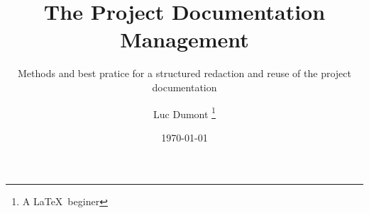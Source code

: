 \documentclass[
	fontsize=10pt, %
	twoside=false, %
	numbers=noenddot, %
]{kaobook}
\begin{document}
\title[The Project Documentation Management]{The Project Documentation Management}
\subtitle{Methods and best pratice for a structured redaction and reuse of the project documentation}
\author[Luc Dumont]{Luc Dumont \thanks{A \LaTeX\ beginer}}
\date{\today}
\publishers{Naept Editions}
\frontmatter %


\mainmatter %

% 
% 
% 
% 
% 
% 
% 
% 
% 
% 
% 

% 
% 
% 


\backmatter %
\end{document}
